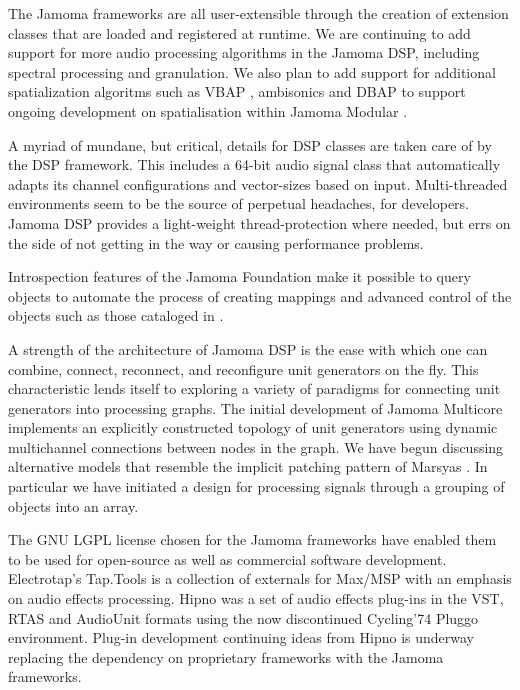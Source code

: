\documentclass[twoside,10pt]{article}
\begin{document}
The Jamoma frameworks are all user-extensible through the creation of extension classes that are loaded and registered at runtime.  We are continuing to add support for more audio processing algorithms in the Jamoma DSP, including spectral processing and granulation. We also plan to add support for additional spatialization algoritms such as VBAP \cite{Pulkki:1997vbap}, ambisonics \cite{Gerzon:1974surround, Poletti:2000holographic_sound} and DBAP \cite{Lossius:2009} to support ongoing development on spatialisation within Jamoma Modular \cite{Peters:2009}.


A myriad of mundane, but critical, details for DSP classes are taken care of by the DSP framework.  This includes a 64-bit audio signal class that automatically adapts its channel configurations and vector-sizes based on input.  Multi-threaded environments seem to be the source of perpetual headaches, for developers.  Jamoma DSP provides a light-weight thread-protection where needed, but errs on the side of not getting in the way or causing performance problems.  

Introspection features of the Jamoma Foundation make it possible to query objects to automate the process of creating mappings and advanced control of the objects such as those cataloged in \cite{Pendharkar:2006}.

A strength of the architecture of Jamoma DSP is the ease with which one can combine, connect, reconnect, and reconfigure unit generators on the fly.  This characteristic lends itself to exploring a variety of paradigms for connecting unit generators into processing graphs.  The initial development of Jamoma Multicore implements an explicitly constructed topology of unit generators using dynamic multichannel connections between nodes in the graph.  We have begun discussing alternative models that resemble the implicit patching pattern of Marsyas \cite{Bray:2005}.  In particular we have initiated a design for processing signals through a grouping of objects into an array.

The GNU LGPL license chosen for the Jamoma frameworks have enabled them to be used for open-source as well as commercial software development.  Electrotap's Tap.Tools \cite{web17} is a collection of externals for Max/MSP with an emphasis on audio effects processing.  Hipno \cite{Place:2005} was a set of audio effects plug-ins in the VST, RTAS and AudioUnit formats using the now discontinued Cycling'74 Pluggo environment.  Plug-in development continuing ideas from Hipno is underway replacing the dependency on proprietary frameworks with the Jamoma frameworks.
\end{document}
